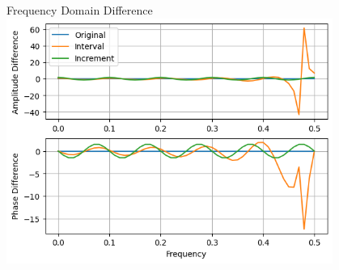 \begin{frame}{Frequency Domain Difference}
    \centering
    \includegraphics[height=0.8\textheight,width=0.8\textwidth,keepaspectratio]{images/sf_f_diff.png}
\end{frame}





